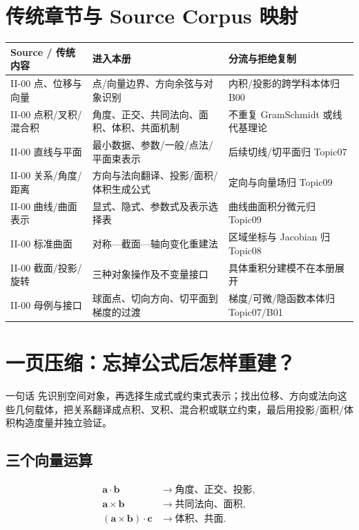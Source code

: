 \documentclass[11pt,a4paper]{ctexart}
\begin{document}
\section{传统章节与 Source Corpus 映射}

\begin{longtable}{L{2.65cm}L{5.35cm}L{\dimexpr\linewidth-8.00cm\relax}}
\toprule
\textbf{Source / 传统内容} & \textbf{进入本册} & \textbf{分流与拒绝复制}\\
\midrule
II-00 点、位移与向量 & 点/向量边界、方向余弦与对象识别 & 内积/投影的跨学科本体归 B00\\
II-00 点积/叉积/混合积 & 角度、正交、共同法向、面积、体积、共面机制 & 不重复 Gram\textendash{}Schmidt 或线代基理论\\
II-00 直线与平面 & 最小数据、参数/一般/点法/平面束表示 & 后续切线/切平面归 Topic07\\
II-00 关系/角度/距离 & 方向与法向翻译、投影/面积/体积生成公式 & 定向与向量场归 Topic09\\
II-00 曲线/曲面表示 & 显式、隐式、参数式及表示选择表 & 曲线曲面积分微元归 Topic09\\
II-00 标准曲面 & 对称—截面—轴向变化重建法 & 区域坐标与 Jacobian 归 Topic08\\
II-00 截面/投影/旋转 & 三种对象操作及不变量接口 & 具体重积分建模不在本册展开\\
II-00 母例与接口 & 球面点、切向方向、切平面到梯度的过渡 & 梯度/可微/隐函数本体归 Topic07/B01\\
\bottomrule
\end{longtable}

\section{一页压缩：忘掉公式后怎样重建？}

\begin{corebox}{一句话}
先识别空间对象，再选择生成式或约束式表示；找出位移、方向或法向这些几何载体，把关系翻译成点积、叉积、混合积或联立约束，最后用投影/面积/体积构造度量并独立验证。
\end{corebox}

\subsection{三个向量运算}
\[
\boxed{
\begin{aligned}
\mathbf a\cdot\mathbf b&\to\text{角度、正交、投影},\\
\mathbf a\times\mathbf b&\to\text{共同法向、面积},\\
(\mathbf a\times\mathbf b)\cdot\mathbf c&\to\text{体积、共面}.
\end{aligned}}
\]
\end{document}
